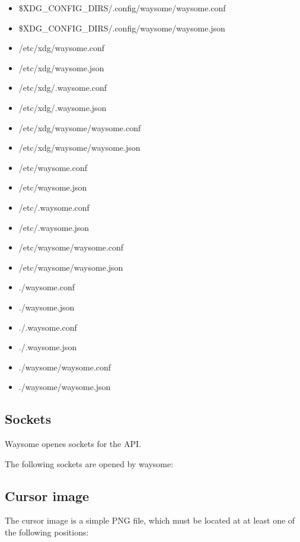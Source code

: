 \begin{itemize}
        \item \$XDG_CONFIG_DIRS/.config/waysome/waysome.conf
        \item \$XDG_CONFIG_DIRS/.config/waysome/waysome.json
        \item /etc/xdg/waysome.conf
        \item /etc/xdg/waysome.json
        \item /etc/xdg/.waysome.conf
        \item /etc/xdg/.waysome.json
        \item /etc/xdg/waysome/waysome.conf
        \item /etc/xdg/waysome/waysome.json
        \item /etc/waysome.conf
        \item /etc/waysome.json
        \item /etc/.waysome.conf
        \item /etc/.waysome.json
        \item /etc/waysome/waysome.conf
        \item /etc/waysome/waysome.json
        \item ./waysome.conf
        \item ./waysome.json
        \item ./.waysome.conf
        \item ./.waysome.json
        \item ./waysome/waysome.conf
        \item ./waysome/waysome.json
    \end{itemize}

\subsection{Sockets}

    Waysome openes sockets for the API.

    The following sockets are opened by waysome:


\subsection{Cursor image}

    The cursor image is a simple PNG file, which must be located at at least one
    of the following positions:


